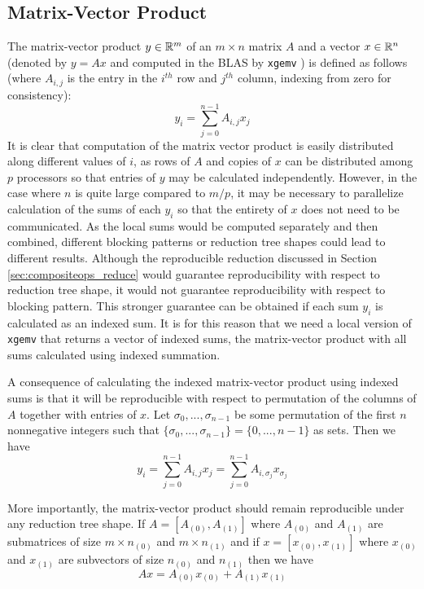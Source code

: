 \subsection{Matrix-Vector Product}
  \label{sec:compositeops_gemv}
  The matrix-vector product $y \in \mathbb{R}^m$ of an $m \times n$ matrix $A$ and a vector $x \in \mathbb{R}^n$ (denoted by $y = Ax$ and computed in the BLAS by \texttt{xgemv} \cite{BLAS}) is defined as follows (where $A_{i, j}$ is the entry in the $i^{th}$ row and $j^{th}$ column, indexing from zero for consistency):
  \[
    y_i = \sum\limits_{j = 0}^{n - 1} A_{i, j}x_j
  \]
  It is clear that computation of the matrix vector product is easily distributed along different values of $i$, as rows of $A$ and copies of $x$ can be distributed among $p$ processors so that entries of $y$ may be calculated independently.
  However, in the case where $n$ is quite large compared to $m/p$, it may be necessary to parallelize calculation of the sums of each $y_i$ so that the entirety of $x$ does not need to be communicated.
  As the local sums would be computed separately and then combined, different blocking patterns or reduction tree shapes could lead to different results.
  Although the reproducible reduction discussed in Section \ref{sec:compositeops_reduce} would guarantee reproducibility with respect to reduction tree shape, it would not guarantee reproducibility with respect to blocking pattern. This stronger guarantee can be obtained if each sum $y_i$ is calculated as an indexed sum.
  It is for this reason that we need a local version of \texttt{xgemv} that returns a vector of indexed sums, the matrix-vector product with all sums calculated using indexed summation.

  A consequence of calculating the indexed matrix-vector product using indexed sums is that it will be reproducible with respect to permutation of the columns of $A$ together with entries of $x$.
  Let $\sigma_0, ..., \sigma_{n - 1}$ be some permutation of the first $n$ nonnegative integers such that $\{\sigma_0, ..., \sigma_{n - 1}\} = \{0, ..., n - 1\}$ as sets. Then we have
  \[
    y_i = \sum\limits_{j = 0}^{n - 1} A_{i, j}x_j = \sum\limits_{j = 0}^{n - 1} A_{i, \sigma_j}x_{\sigma_j}
  \]

  More importantly, the matrix-vector product should remain reproducible under any reduction tree shape.
  If $A = [A_{(0)}, A_{(1)}]$ where $A_{(0)}$ and $A_{(1)}$ are submatrices of size $m \times n_{(0)}$ and $m \times n_{(1)}$ and if $x = [x_{(0)}, x_{(1)}]$ where $x_{(0)}$ and $x_{(1)}$ are subvectors of size $n_{(0)}$ and $n_{(1)}$ then we have 
  \[
    Ax = A_{(0)}x_{(0)} + A_{(1)}x_{(1)}
  \]


